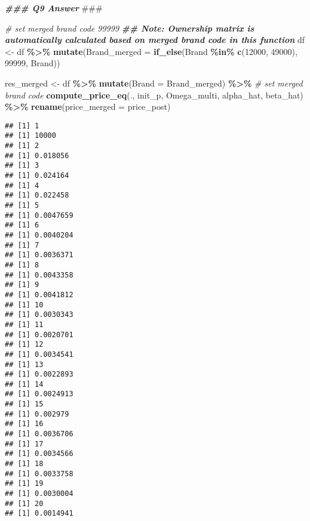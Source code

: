 \documentclass[
]{article}
\newenvironment{Shaded}{\begin{snugshade}}{\end{snugshade}}
\newcommand{\AlertTok}[1]{\textcolor[rgb]{0.94,0.16,0.16}{#1}}
\newcommand{\AttributeTok}[1]{\textcolor[rgb]{0.13,0.29,0.53}{#1}}
\newcommand{\CommentTok}[1]{\textcolor[rgb]{0.56,0.35,0.01}{\textit{#1}}}
\newcommand{\DecValTok}[1]{\textcolor[rgb]{0.00,0.00,0.81}{#1}}
\newcommand{\DocumentationTok}[1]{\textcolor[rgb]{0.56,0.35,0.01}{\textbf{\textit{#1}}}}
\newcommand{\FunctionTok}[1]{\textcolor[rgb]{0.13,0.29,0.53}{\textbf{#1}}}
\newcommand{\NormalTok}[1]{#1}
\newcommand{\OtherTok}[1]{\textcolor[rgb]{0.56,0.35,0.01}{#1}}
\newcommand{\SpecialCharTok}[1]{\textcolor[rgb]{0.81,0.36,0.00}{\textbf{#1}}}
\begin{document}
\begin{Shaded}
\begin{Highlighting}[]
\DocumentationTok{\#\#\# Q9 Answer }\AlertTok{\#\#\#}

\CommentTok{\# set merged brand code 99999}
\DocumentationTok{\#\# Note: Ownership matrix is automatically calculated based on merged brand code in this function}
\NormalTok{df }\OtherTok{\textless{}{-}}\NormalTok{ df }\SpecialCharTok{\%\textgreater{}\%}
  \FunctionTok{mutate}\NormalTok{(}\AttributeTok{Brand\_merged =} \FunctionTok{if\_else}\NormalTok{(Brand }\SpecialCharTok{\%in\%} \FunctionTok{c}\NormalTok{(}\DecValTok{12000}\NormalTok{, }\DecValTok{49000}\NormalTok{), }\DecValTok{99999}\NormalTok{, Brand))}


\NormalTok{res\_merged }\OtherTok{\textless{}{-}}\NormalTok{ df }\SpecialCharTok{\%\textgreater{}\%}
  \FunctionTok{mutate}\NormalTok{(}\AttributeTok{Brand =}\NormalTok{ Brand\_merged) }\SpecialCharTok{\%\textgreater{}\%} \CommentTok{\# set merged brand code}
  \FunctionTok{compute\_price\_eq}\NormalTok{(., init\_p, Omega\_multi, alpha\_hat, beta\_hat) }\SpecialCharTok{\%\textgreater{}\%}
  \FunctionTok{rename}\NormalTok{(}\AttributeTok{price\_merged =}\NormalTok{ price\_post)}
\end{Highlighting}
\end{Shaded}

\begin{verbatim}
## [1] 1
## [1] 10000
## [1] 2
## [1] 0.018056
## [1] 3
## [1] 0.024164
## [1] 4
## [1] 0.022458
## [1] 5
## [1] 0.0047659
## [1] 6
## [1] 0.0040204
## [1] 7
## [1] 0.0036371
## [1] 8
## [1] 0.0043358
## [1] 9
## [1] 0.0041812
## [1] 10
## [1] 0.0030343
## [1] 11
## [1] 0.0020701
## [1] 12
## [1] 0.0034541
## [1] 13
## [1] 0.0022893
## [1] 14
## [1] 0.0024913
## [1] 15
## [1] 0.002979
## [1] 16
## [1] 0.0036706
## [1] 17
## [1] 0.0034566
## [1] 18
## [1] 0.0033758
## [1] 19
## [1] 0.0030004
## [1] 20
## [1] 0.0014941
\end{verbatim}
\end{document}
